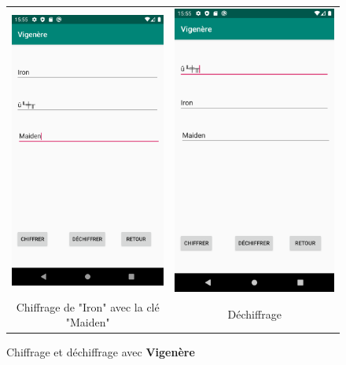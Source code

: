 \documentclass{article}
\begin{document}
\begin{figure}[b!]
    \centering
    \begin{tabular}{cc}
      \includegraphics[width=.35\linewidth]{./img/vigenere_e.png} &
      \includegraphics[width=.35\linewidth]{./img/vigenere_d.png} \\
      Chiffrage de "Iron" avec la clé "Maiden" & Déchiffrage \\
    \end{tabular}
    \caption{Chiffrage et déchiffrage avec \textbf{Vigenère}}\label{fig:vigenere}
\end{figure}
\end{document}
